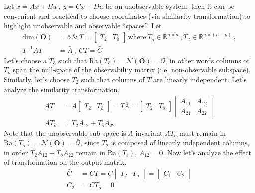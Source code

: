 \documentclass[twoside]{article}
\begin{document}
Let $\dot{x} = A x + B u \ , \ y = C x + D u$ be an unobservable system; then it can be convenient and practical to choose coordinates (via similarity transformation)
to highlight unobservable and observable ``spaces''. Let 
%
\begin{align*}
   \mathrm{dim}({\mathcal{\mathbf{O}}}) &= \bar{o} 
   \ \& \
   T = \left[ \begin{array}{c|c} T_2 & T_{\bar{o}}  \end{array} \right] \ \mathrm{where} \ T_{\bar{o}} \in \mathbb{R}^{n \times \bar{o}} \ , 
   T_2 \in \mathbb{R}^{n \times (n-\bar{o})} \ , 
   \\
   T^{-1} A T &= \bar{A} \ , \ C T = \bar{C}
\end{align*}
%
Let's choose a $T_{\bar{o}}$ such that $\mathrm{Ra}(T_{\bar{o}}) = \mathcal{N}(\mathbf{O}) = \bar{\mathcal{O}}$, in other words columns of $T_{\bar{o}}$
span the null-space of the observability matrix (i.e. non-observable subspace).
Similarly, let's choose $T_2$ such that columns of $T$ are linearly independent. Let's analyze the similarity transformation. 
%
\begin{align*}
    A T &=  A \left[ \begin{array}{c|c} T_2 & T_{\bar{o}} \end{array} \right] = T \bar{A} = \left[ \begin{array}{c|c} T_2 & T_{\bar{o}} \end{array} \right]
    \left[ \begin{array}{c|c} A_{11} & A_{12} \\ \hline A_{21} & A_{22}  \end{array} \right]
    \\
    A T_{\bar{o}} &= T_2 A_{12} + T_{\bar{o}} A_{22}
\end{align*}
%
Note that the unobservable sub-space is $A$ invariant $A T_{\bar{o}}$ must remain in $\mathrm{Ra}(T_{\bar{o}}) = \mathcal{N}(\mathbf{O}) = \bar{\mathcal{O}}$,
since $T_2$ is composed of linearly independent columns, in order $T_2 A_{12} + T_{\bar{o}} A_{22}$ remain in $\mathrm{Ra}(T_{\bar{o}})$, $A_{12} = \mathbf{0}$.
Now let's analyze the effect of transformation on the output matrix.
%
\begin{align*}
    \bar{C} &= C T = C \left[ \begin{array}{c|c} T_2 & T_{\bar{o}} \end{array} 
    \right] = \left[ \begin{array}{c|c} C_1 & C_2  \end{array} \right]
    \\
    C_2 &= C T_{\bar{o}} = 0
\end{align*}
\end{document}
